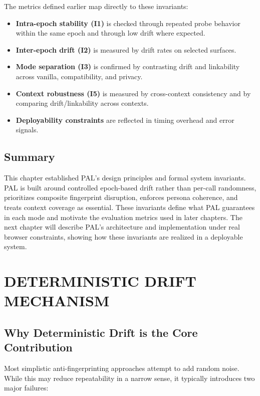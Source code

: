 \documentclass[11pt]{report}
\begin{document}
The metrics defined earlier map directly to these invariants:

\begin{itemize}
    \item \textbf{Intra-epoch stability (I1)} is checked through repeated probe behavior within the same epoch and through low drift where expected.
    \item \textbf{Inter-epoch drift (I2)} is measured by drift rates on selected surfaces.
    \item \textbf{Mode separation (I3)} is confirmed by contrasting drift and linkability across vanilla, compatibility, and privacy.
    \item \textbf{Context robustness (I5)} is measured by cross-context consistency and by comparing drift/linkability across contexts.
    \item \textbf{Deployability constraints} are reflected in timing overhead and error signals.
\end{itemize}

\section{Summary}

This chapter established PAL’s design principles and formal system invariants. PAL is built around controlled epoch-based drift rather than per-call randomness, prioritizes composite fingerprint disruption, enforces persona coherence, and treats context coverage as essential. These invariants define what PAL guarantees in each mode and motivate the evaluation metrics used in later chapters. The next chapter will describe PAL’s architecture and implementation under real browser constraints, showing how these invariants are realized in a deployable system.











\chapter{DETERMINISTIC DRIFT MECHANISM}

\section{Why Deterministic Drift is the Core Contribution}

Most simplistic anti-fingerprinting approaches attempt to add random noise. While this may reduce repeatability in a narrow sense, it typically introduces two major failures:
\end{document}
